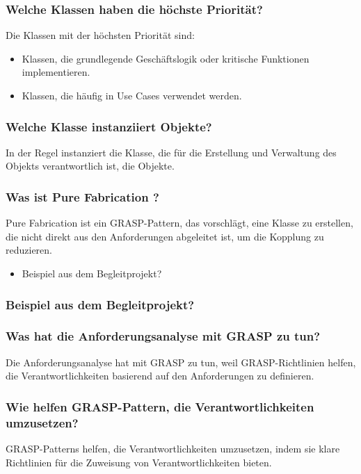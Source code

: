 \documentclass[main.tex]{subfiles}
\begin{document}
\subsubsection*{Welche Klassen haben die höchste Priorität?}
Die Klassen mit der höchsten Priorität sind:
\begin{itemize}
    \item Klassen, die grundlegende Geschäftslogik oder kritische Funktionen implementieren.
    \item Klassen, die häufig in \glspl{Use Case} verwendet werden.
\end{itemize}


\subsubsection*{Welche Klasse instanziiert Objekte?}
In der Regel instanziert die Klasse, die für die Erstellung und Verwaltung des Objekts verantwortlich ist, die Objekte.


\subsubsection*{Was ist \gls{Pure Fabrication} ?}
\gls{Pure Fabrication}  ist ein \gls{GRASP-Pattern}, das vorschlägt, eine Klasse zu erstellen, die nicht direkt aus den Anforderungen abgeleitet ist, um die \gls{Kopplung} zu reduzieren.

\begin{itemize}
    \item Beispiel aus dem Begleitprojekt? %
\end{itemize}

\subsubsection*{Beispiel aus dem Begleitprojekt?} %

\subsubsection*{Was hat die Anforderungsanalyse mit GRASP zu tun?}
Die Anforderungsanalyse hat mit GRASP zu tun, weil GRASP-Richtlinien helfen, die Verantwortlichkeiten basierend auf den Anforderungen zu definieren.


\subsubsection*{Wie helfen \gls{GRASP-Pattern}, die Verantwortlichkeiten umzusetzen?}
\gls{GRASP-Pattern}s helfen, die Verantwortlichkeiten umzusetzen, indem sie klare Richtlinien für die Zuweisung von Verantwortlichkeiten bieten.
\end{document}
